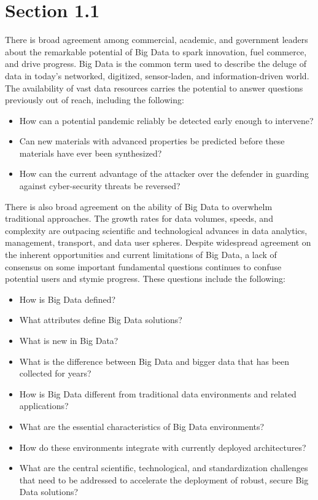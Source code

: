 \section{Section 1.1}

There is broad agreement among commercial, academic, and government leaders about the remarkable potential of Big Data to spark innovation, fuel commerce, and drive progress. Big Data is the common term used to describe the deluge of data in today's networked, digitized, sensor-laden, and information-driven world. The availability of vast data resources carries the potential to answer questions previously out of reach, including the following:

\begin{itemize}
\item	How can a potential pandemic reliably be detected early enough to intervene? 
\item	Can new materials with advanced properties be predicted before these materials have ever been synthesized? 
\item	How can the current advantage of the attacker over the defender in guarding against cyber-security threats be reversed? 
\end{itemize}

There is also broad agreement on the ability of Big Data to overwhelm traditional approaches. The growth rates for data volumes, speeds, and complexity are outpacing scientific and technological advances in data analytics, management, transport, and data user spheres. 
Despite widespread agreement on the inherent opportunities and current limitations of Big Data, a lack of consensus on some important fundamental questions continues to confuse potential users and stymie progress. These questions include the following: 

\begin{itemize}

\item	How is Big Data defined?

\item	What attributes define Big Data solutions? 

\item	What is new in Big Data?

\item What is the difference between Big Data and bigger data that has
been collected for years?

\item	How is Big Data different from traditional data environments and related applications? 

\item	What are the essential characteristics of Big Data environments? 

\item	How do these environments integrate with currently deployed architectures? 

\item What are the central scientific, technological, and
standardization challenges that need to be addressed to accelerate the
deployment of robust, secure Big Data solutions?

\end{itemize}

